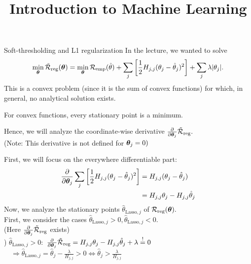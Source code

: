 \documentclass[11pt,compress,t,notes=noshow, xcolor=table]{beamer}
\title{Introduction to Machine Learning}
\date{}
\begin{document}



\begin{vbframe}{Soft-thresholding and L1 regularization}
In the lecture, we wanted to solve
     \[
      \min_{\bm{\theta}} \mathcal{\tilde R}_{\text{reg}}(\bm{\theta}) =  \min_{\bm{\theta}}\mathcal{R}_{\text{emp}}(\hat{\theta}) + \sum_j \left[ \frac{1}{2} H_{j,j} (\theta_j - \hat{\theta}_j)^2 \right] + \sum_j \lambda |\theta_j|.
      \] 
This is a convex problem (since it is the sum of convex functions) for which, in general, no analytical solution exists. \\
\lz

For convex functions, every stationary point is a minimum. \\
\lz

 Hence, we will analyze the coordinate-wise derivative $\frac{\partial}{\partial \bm{\theta}_j} \mathcal{\tilde R}_{\text{reg}}.$ \\
 (Note: This derivative is not defined for $\bm{\theta}_j = 0)$\\

\framebreak

First, we will focus on the everywhere differentiable part:
\begin{align*}
\frac{\partial}{\partial \bm{\theta}_j}\sum_j \left[\frac{1}{2}  H_{j,j} (\theta_j - \hat{\theta}_j)^2 \right]
    &=  H_{j,j} (\theta_j - \hat{\theta}_j)  \\
        &= H_{j,j}\theta_j - H_{j,j} \hat{\theta}_j  \\
\end{align*}
Now, we analyze the stationary points $\hat{\theta}_{\text{Lasso},j}$ of $\mathcal{R}_{\text{reg}}(\bm{\theta}).$ \\
First, we consider the cases $\hat{\theta}_{\text{Lasso},j} > 0, \hat{\theta}_{\text{Lasso},j} < 0.$ \\
(Here $\frac{\partial}{\partial \bm{\theta}_j}\mathcal{\tilde R}_{\text{reg}}$ exists) \\
) $\hat{\theta}_{\text{Lasso},j} > 0:$
$\frac{\partial}{\partial \bm{\theta}_j}\mathcal{\tilde R}_{\text{reg}} = H_{j,j}\theta_j - H_{j,j} \hat{\theta}_j + \lambda \overset{!}{=} 0$ \\
$\quad \Rightarrow  \hat{\theta}_{\text{Lasso},j} = \hat{\theta}_j 
 -\frac{\lambda}{H_{j,j}} > 0 \iff \hat{\theta}_j >  \frac{\lambda}{H_{j,j}}$\\

\framebreak


\end{vbframe}
\end{document}
